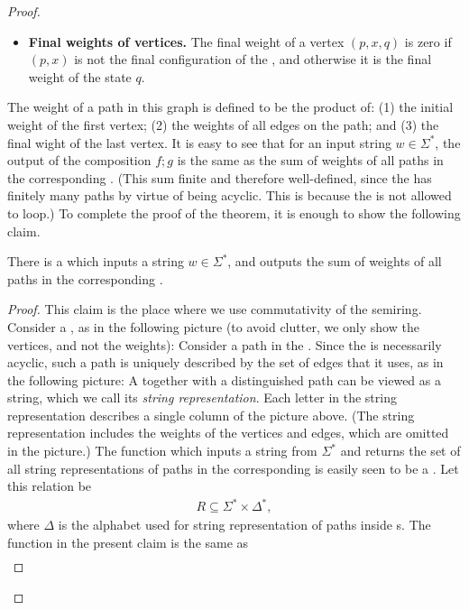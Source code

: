\begin{proof}
\begin{itemize}
        \item \textbf{Final weights of vertices.} The final weight of a vertex $(p,x,q)$ is zero if $(p,x)$ is not the final configuration of the , and otherwise it is the final weight of the state $q$.
    \end{itemize}
The weight of a path in this graph is defined to be the product of: (1) the initial weight of the first vertex; (2) the weights of all edges on the path; and (3) the final wight of the last vertex. It is  easy to see that for an input string $w \in \Sigma^*$, the output of the composition $f;g$ is the same as the sum of weights of all paths in the corresponding .  (This sum finite and therefore well-defined, since the  has finitely many paths by virtue of being  acyclic. This is because the  is not allowed to loop.) To complete the proof of the theorem, it is enough to show the following claim.
\begin{claim}
    There is a  which inputs a string $w \in \Sigma^*$, and outputs the sum of weights of all paths in the corresponding .
\end{claim}
\begin{proof}
    This claim is the place where we use commutativity of the semiring. Consider a , as in the following picture (to avoid clutter, we only show the vertices, and not the weights):
    Consider a path in the . Since the  is necessarily acyclic, such a path is uniquely described by the set of edges that it uses, as in the   following picture:  
    A  together with a distinguished path can be viewed as a string, which we call its \emph{string representation}. Each letter in the string representation describes a single column of the picture above. (The string representation includes the weights of the vertices and edges, which are omitted in the picture.)     The function which inputs a string from $\Sigma^*$ and returns the set of all string representations of paths in the corresponding  is easily seen to be a . Let this relation be 
    \begin{align*}
    R \subseteq \Sigma^* \times \Delta^*,
    \end{align*}
    where $\Delta$ is the alphabet used for string representation of paths inside s. The function in the present claim is the same as 
    \begin{align*}

\end{align*}
\end{proof}
\end{proof}
